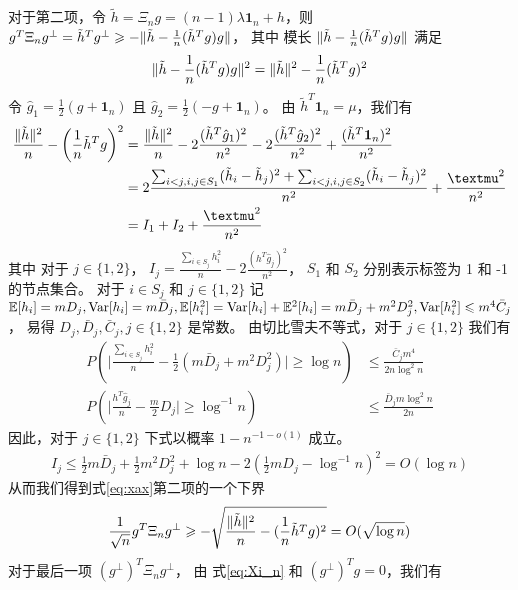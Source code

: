 对于第二项，令  $\tilde{h}=\Xi_n g
=(n-1)\lambda\mathbf{1}_n+h$，则
$g^T \Xi_n g^{\perp} = \tilde{h}^T g^{\perp} \geqslant -\lVert\tilde{h}-\frac{1}{n}(\tilde{h}^Tg)g\rVert$，
其中 模长 $\lVert\tilde{h}-\frac{1}{n}(\tilde{h}^Tg)g\rVert$ 满足
\begin{align*}
    \lVert\tilde{h}-\frac{1}{n}(\tilde{h}^Tg)g\rVert^2
    =\lVert\tilde{h}\rVert^2 - \frac{1}{n}(\tilde{h}^Tg)^2
\end{align*}
令 $\hat{g}_1 = \frac{1}{2}(g + \mathbf{1}_n)$ 且
$\hat{g}_2 = \frac{1}{2}(-g +\mathbf{1}_n)$。
由 $\tilde{h}^T\mathbf{1}_n=\mu$，我们有
\begin{align*}
    \frac{\norm{\tilde{h}}^2}{n} - \left(\frac{1}{n}\tilde{h}^Tg \right)^2
    &=\frac{\norm{\tilde{h}}^2}{n} - 2\frac{(\tilde{h}^T \hat{g}_1)^2}{n^2} - 2\frac{(\tilde{h}^T \hat{g}_2)^2}{n^2} + \frac{(\tilde{h}^T\mathbf{1}_n)^2}{n^2} \\
    &=2\frac{ \sum_{i<j,i,j\in S_1} (\tilde{h}_i - \tilde{h}_j)^2 + \sum_{i<j,i,j\in S_2} (\tilde{h}_i - \tilde{h}_j)^2 }{n^2}+ \frac{\mu^2}{n^2}\\
    & = I_1 + I_2 + \frac{\mu^2}{n^2}
\end{align*}
其中 对于 $j\in\{1,2\}$，
$I_j=\frac{\sum_{i\in S_j} h_i^2}{n} - 2\frac{(h^T \hat{g}_j)^2}{n^2}$， 
$S_1$ 和 $S_2$ 分别表示标签为 1 和 -1 的节点集合。
对于 $i\in S_j$ 和 $j\in\{1,2\}$
记 $\mathbb{E}[h_i]=m D_j, \operatorname{\mathrm{Var}}[h_i]=m \bar{D}_j, 
\mathbb{E}[h_i^2]=\operatorname{\mathrm{Var}}[h_i]+\mathbb{E}^2[h_i]=m \bar{D}_j+m^2 D^2_j, \operatorname{\mathrm{Var}}[h_i^2] \leqslant m^4 \bar{C}_j$，
易得
$D_j,\bar{D}_j, \bar{C}_j,j\in\{1,2\}$ 是常数。
由切比雪夫不等式，对于 $j\in\{1,2\}$
我们有
\begin{align*}
    P\left(\Big| \frac{\sum_{i\in S_j} h_i^2}{n} - \frac{1}{2}(m \bar{D}_j + m^2D_j^2) \Big| \geq \log n \right)
    & \leq \frac{\bar{C}_j m^4}{2n\log^2 n} \\
    P\left(\Big| \frac{h^T \hat{g}_j}{n} - \frac{m}{2}D_j\Big| \geq \log^{-1} n \right)
    & \leq \frac{\bar{D}_j m \log^{2} n}{2n}
\end{align*}
因此，对于 $j\in\{1,2\}$ 下式以概率 $1-n^{-1-o(1)}$ 成立。
\begin{align*}
    I_j \leq \frac{1}{2}m\bar{D}_j + \frac{1}{2}m^2 D_j^2 + \log n - 2(\frac{1}{2}m D_j - \log^{-1} n)^2 = O(\log n)
\end{align*}
从而我们得到式\eqref{eq:xax}第二项的一个下界
$$
\frac{1}{\sqrt{n}} g^T \Xi_n g^{\perp} \geqslant -\sqrt{\frac{\lVert\tilde{h}\rVert^2}{n} - (\frac{1}{n}\tilde{h}^Tg)^2} = O(\sqrt{\log n})
$$
对于最后一项 $(g^{\perp})^T \Xi_n g^{\perp}$，
由 式\eqref{eq:Xi_n} 和 $(g^{\perp})^Tg=0$，我们有
